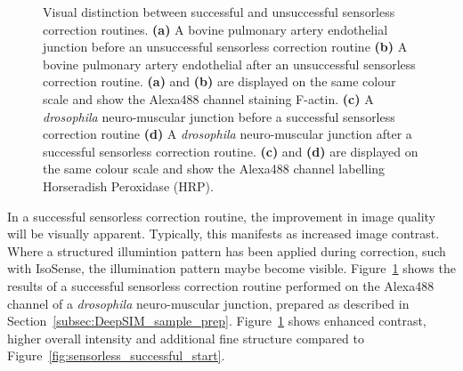 \begin{figure}[h]
\begin{subfigure}{0.48\textwidth}
		\caption{}
		\label{fig:sensorless_successful_end}
	\end{subfigure}
	\caption[Visual distinction between unsuccessful and successful sensorless correction routines]{Visual distinction between successful and unsuccessful sensorless correction routines. \textbf{(a)} A bovine pulmonary artery endothelial junction before an unsuccessful sensorless correction routine \textbf{(b)} A bovine pulmonary artery endothelial after an unsuccessful sensorless correction routine. \textbf{(a)} and \textbf{(b)} are displayed on the same colour scale and show the Alexa488 channel staining F-actin. \textbf{(c)} A \textit{drosophila} neuro-muscular junction before a successful sensorless correction routine \textbf{(d)} A \textit{drosophila} neuro-muscular junction after a successful sensorless correction routine. \textbf{(c)} and \textbf{(d)} are displayed on the same colour scale and show the Alexa488 channel labelling Horseradish Peroxidase (HRP).}
	\label{fig:sensorless_routine_success_failure}
\end{figure}

In a successful sensorless correction routine, the improvement in image 
quality will be visually apparent. Typically, this manifests as increased 
image contrast. Where a structured illumintion pattern has been applied 
during correction, such with IsoSense, the illumination pattern maybe become 
visible. Figure~\ref{fig:sensorless_successful_end} shows the results of a 
successful sensorless correction routine performed on the Alexa488 channel of 
a \textit{drosophila} neuro-muscular junction, prepared as described in 
Section~\ref{subsec:DeepSIM_sample_prep}. 
Figure~\ref{fig:sensorless_successful_end} shows enhanced contrast, higher 
overall intensity and additional fine structure compared to 
Figure~\ref{fig:sensorless_successful_start}.